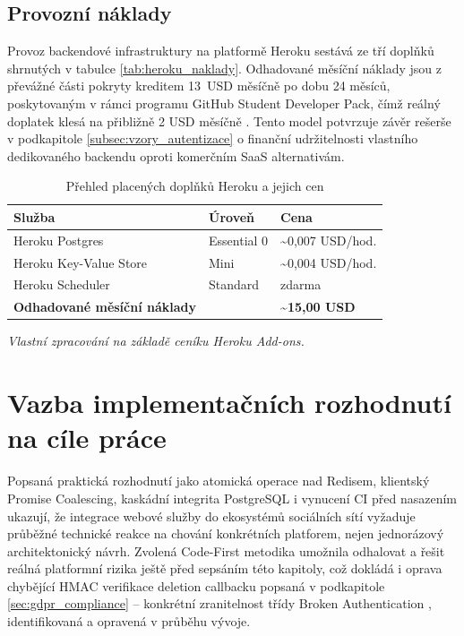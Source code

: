 \documentclass[male,czech,api_bc]{kitheses}
\renewcommand{\arraystretch}{1.23}
\newcommand{\zdroj}[1]{%
    \vspace{1ex}%
    {\footnotesize \raggedright \textit{#1}\par}%
}
\begin{document}
\subsection{Provozní náklady}

Provoz backendové infrastruktury na platformě Heroku sestává ze tří doplňků shrnutých v tabulce \vref{tab:heroku_naklady}. Odhadované měsíční náklady jsou z převážné části pokryty kreditem 13~USD měsíčně po dobu 24 měsíců, poskytovaným v rámci programu GitHub Student Developer Pack, čímž reálný doplatek klesá na přibližně 2 USD měsíčně \cite{HerokuGithubStudents2026}. Tento model potvrzuje závěr rešerše v podkapitole \vref{subsec:vzory_autentizace} o finanční udržitelnosti vlastního dedikovaného backendu oproti komerčním SaaS alternativám.

\begin{table}[htbp]
\centering
\small
\renewcommand{\arraystretch}{1.3}
\begin{tabularx}{\textwidth}{@{} >{\raggedright\arraybackslash}X >{\raggedright\arraybackslash}X >{\raggedleft\arraybackslash}X @{}}
\toprule
\textbf{Služba} & \textbf{Úroveň} & \textbf{Cena} \\
\midrule
Heroku Postgres         & Essential 0 & \textasciitilde 0,007 USD/hod. \\
Heroku Key-Value Store  & Mini        & \textasciitilde 0,004 USD/hod. \\
Heroku Scheduler        & Standard    & zdarma \\
\midrule
\textbf{Odhadované měsíční náklady} & & \textbf{\textasciitilde 15,00 USD} \\
\bottomrule
\end{tabularx}
\caption{Přehled placených doplňků Heroku a jejich cen}
\label{tab:heroku_naklady}
\zdroj{Vlastní zpracování na základě ceníku Heroku Add-ons.}
\end{table}

\section{Vazba implementačních rozhodnutí na cíle práce}
\label{sec:synteza_rozhodnuti}

Popsaná praktická rozhodnutí jako atomická operace nad Redisem, klientský Promise Coalescing, kaskádní integrita PostgreSQL i vynucení CI před nasazením ukazují, že integrace webové služby do ekosystémů sociálních sítí vyžaduje průběžné technické reakce na chování konkrétních platforem, nejen jednorázový architektonický návrh. Zvolená Code-First metodika umožnila odhalovat a řešit reálná platformní rizika ještě před sepsáním této kapitoly, což dokládá i oprava chybějící HMAC verifikace deletion callbacku popsaná v podkapitole \vref{sec:gdpr_compliance} -- konkrétní zranitelnost třídy Broken Authentication \cite{Yalon2023API2}, identifikovaná a opravená v průběhu vývoje.
\end{document}
